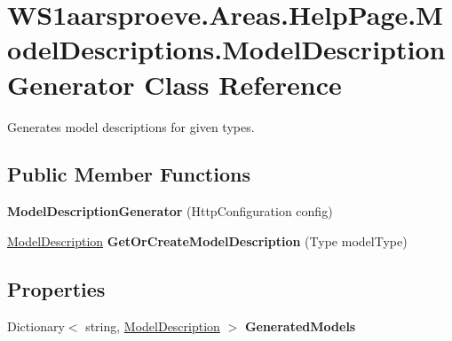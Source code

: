 \hypertarget{class_w_s1aarsproeve_1_1_areas_1_1_help_page_1_1_model_descriptions_1_1_model_description_generator}{}\section{W\+S1aarsproeve.\+Areas.\+Help\+Page.\+Model\+Descriptions.\+Model\+Description\+Generator Class Reference}
\label{class_w_s1aarsproeve_1_1_areas_1_1_help_page_1_1_model_descriptions_1_1_model_description_generator}


Generates model descriptions for given types.  


\subsection*{Public Member Functions}
\begin{DoxyCompactItemize}
\item 
\hypertarget{class_w_s1aarsproeve_1_1_areas_1_1_help_page_1_1_model_descriptions_1_1_model_description_generator_a7820ceadc3843f498ba7e80e3e01fc7f}{}{\bfseries Model\+Description\+Generator} (Http\+Configuration config)\label{class_w_s1aarsproeve_1_1_areas_1_1_help_page_1_1_model_descriptions_1_1_model_description_generator_a7820ceadc3843f498ba7e80e3e01fc7f}

\item 
\hypertarget{class_w_s1aarsproeve_1_1_areas_1_1_help_page_1_1_model_descriptions_1_1_model_description_generator_af06a76031682a0607cf3928ad7c3de6b}{}\hyperlink{class_w_s1aarsproeve_1_1_areas_1_1_help_page_1_1_model_descriptions_1_1_model_description}{Model\+Description} {\bfseries Get\+Or\+Create\+Model\+Description} (Type model\+Type)\label{class_w_s1aarsproeve_1_1_areas_1_1_help_page_1_1_model_descriptions_1_1_model_description_generator_af06a76031682a0607cf3928ad7c3de6b}

\end{DoxyCompactItemize}
\subsection*{Properties}
\begin{DoxyCompactItemize}
\item 
\hypertarget{class_w_s1aarsproeve_1_1_areas_1_1_help_page_1_1_model_descriptions_1_1_model_description_generator_ab2b957d3389aca7c21e06e14c182af58}{}Dictionary$<$ string, \hyperlink{class_w_s1aarsproeve_1_1_areas_1_1_help_page_1_1_model_descriptions_1_1_model_description}{Model\+Description} $>$ {\bfseries Generated\+Models}\label{class_w_s1aarsproeve_1_1_areas_1_1_help_page_1_1_model_descriptions_1_1_model_description_generator_ab2b957d3389aca7c21e06e14c182af58}

\end{DoxyCompactItemize}


